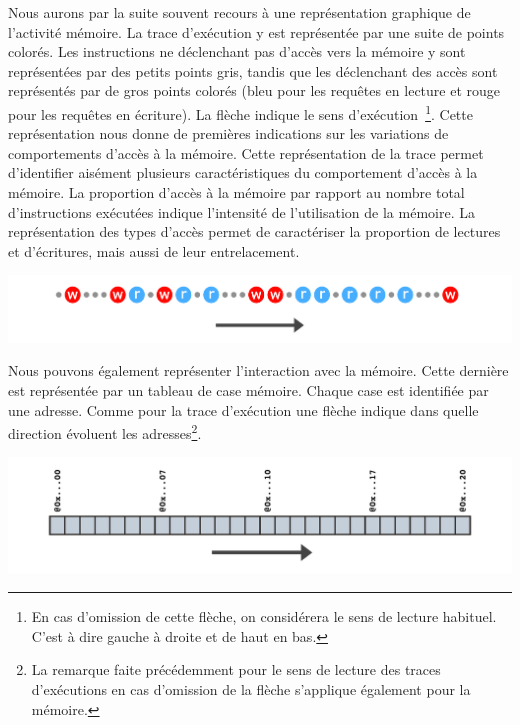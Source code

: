 Nous aurons par la suite souvent recours à une représentation graphique de l'activité mémoire.
La trace d'exécution y est représentée par une suite de points colorés.
Les instructions ne déclenchant pas d'accès vers la mémoire y sont représentées par des petits points gris, tandis que les déclenchant des accès sont représentés par de gros points colorés (bleu pour les requêtes en lecture et rouge pour les requêtes en écriture).
La flèche indique le sens d'exécution~\footnote{En cas d'omission de cette flèche, on considérera le sens de lecture habituel. C'est à dire gauche à droite et de haut en bas.}.
Cette représentation nous donne de premières indications sur les variations de comportements d'accès à la mémoire.
Cette représentation de la trace permet d'identifier aisément plusieurs caractéristiques du comportement d'accès à la mémoire.
La proportion d'accès à la mémoire par rapport au nombre total d'instructions exécutées indique l'intensité de l'utilisation de la mémoire.
La représentation des types d'accès permet de caractériser la proportion de lectures et d'écritures, mais aussi de leur entrelacement.

\begin{center}
	\includegraphics[width=0.8\linewidth]{graphics/figures/template-profils-evenementiels-trace.pdf}
\end{center}

Nous pouvons également représenter l'interaction avec la mémoire.
Cette dernière est représentée par un tableau de case mémoire.
Chaque case est identifiée par une adresse.
Comme pour la trace d'exécution une flèche indique dans quelle direction évoluent les adresses\footnote{La remarque faite précédemment pour le sens de lecture des traces d'exécutions en cas d'omission de la flèche s'applique également pour la mémoire.}.

\begin{center}
	\includegraphics[width=0.8\linewidth]{graphics/figures/template-profils-evenementiels-memoire.pdf}
\end{center}

